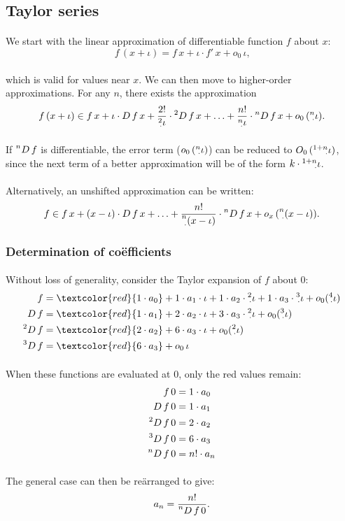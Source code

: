\documentclass[11pt]{article}
\newcommand*\id{\iota}
\newcommand*\cd{\cdot}
\newcommand*\prg{\paragraph}
\newcommand*\pt{\prescript}
\begin{document}
\subsection{Taylor series}
\prg{}We start with the linear approximation of differentiable function $f$ about $x$:
\[
f\,(x+\id)=f\,x+\id\cd f'\,x+o_0\,\id\textrm{,}
\]
\prg{}which is valid for values near $x$. We can then move to higher-order approximations. For any $n$, there exists the approximation
\[
f\,(x+\id)\in f\,x+\id\cd D\,f\,x+\frac{2!}{\pt 2\cd\id}\cd\pt{2}{}D\,f\,x+\dotsc+\frac{n!}{\pt n\cd\id}\cd\pt{n}{}D\,f\,x+o_0\,(\pt n\cd\id)\textrm{.}
\]
\prg{}If $\pt{n}{}D\,f$ is differentiable, the error term ($o_0\,(\pt n\cd\id)$) can be reduced to $O_0\,(\pt{1+n}{\cd}\id)$, since the next term of a better approximation will be of the form $k\cd\pt{1+n}{\cd}\id$.

\prg{}Alternatively, an unshifted approximation can be written:
\[
f\in f\,x+(x-\id)\cd D\,f\,x+\dotsc+\frac{n!}{\pt n\cd(x-\id)}\cd\pt{n}{}D\,f\,x+o_x\,(\pt n\cd(x-\id))\textrm{.}
\]
\subsubsection{Determination of co\"efficients}
\prg{}Without loss of generality, consider the Taylor expansion of $f$ about $0$:
\setcounter{equation}{0}
\[
\begin{aligned}
f&=\textcolor{red}{1\cd a_0}+1\cd a_1\cd\id+1\cd a_2\cd\pt 2\cd\id+1\cd a_3\cd\pt 3\cd\id+o_0(\pt 4\cd\id) \\
D\,f&=\textcolor{red}{1\cd a_1}+2\cd a_2\cd\id+3\cd a_3\cd\pt 2\cd\id+o_0(\pt 3\cd\id) \\
\pt{2}{}D\,f&=\textcolor{red}{2\cd a_2}+6\cd a_3\cd\id+o_0(\pt 2\cd\id) \\
\pt{3}{}D\,f&=\textcolor{red}{6\cd a_3}+o_0\,\id
\end{aligned}
\]
\prg{}When these functions are evaluated at $0$, only the red values remain:
\[
\begin{aligned}
f\,0&=1\cd a_0                   \\
D\,f\,0&=1\cd a_1                \\
\pt{2}{}D\,f\,0&=2\cd a_2 \\
\pt{3}{}D\,f\,0&=6\cd a_3 \\
\pt{n}{}D\,f\,0&=n!\cd a_n
\end{aligned}
\]
\prg{}The general case can then be re\"arranged to give:
\[
a_n=\frac{n!}{\pt{n}{}D\,f\,0}\textrm{.}
\]
\end{document}
